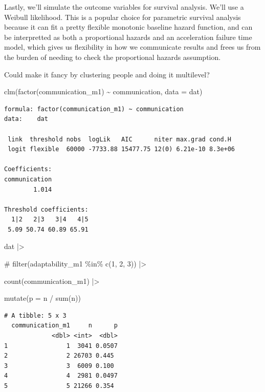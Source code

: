 \documentclass[
  letterpaper,
  DIV=11,
  numbers=noendperiod]{scrreprt}
\newenvironment{Shaded}{\begin{snugshade}}{\end{snugshade}}
\newcommand{\AttributeTok}[1]{\textcolor[rgb]{0.40,0.45,0.13}{#1}}
\newcommand{\CommentTok}[1]{\textcolor[rgb]{0.37,0.37,0.37}{#1}}
\newcommand{\FunctionTok}[1]{\textcolor[rgb]{0.28,0.35,0.67}{#1}}
\newcommand{\NormalTok}[1]{\textcolor[rgb]{0.00,0.23,0.31}{#1}}
\newcommand{\SpecialCharTok}[1]{\textcolor[rgb]{0.37,0.37,0.37}{#1}}
\begin{document}
Lastly, we'll simulate the outcome variables for survival analysis.
We'll use a Weibull likelihood. This is a popular choice for parametric
survival analysis because it can fit a pretty flexible monotonic
baseline hazard function, and can be interpretted as both a proportional
hazards and an acceleration failure time model, which gives us
flexibility in how we communicate results and frees us from the burden
of needing to check the proportional hazards assumption.

Could make it fancy by clustering people and doing it multilevel?

\begin{Shaded}
\begin{Highlighting}[]
\FunctionTok{clm}\NormalTok{(}\FunctionTok{factor}\NormalTok{(communication\_m1) }\SpecialCharTok{\textasciitilde{}}\NormalTok{ communication, }\AttributeTok{data =}\NormalTok{ dat)}
\end{Highlighting}
\end{Shaded}

\begin{verbatim}
formula: factor(communication_m1) ~ communication
data:    dat

 link  threshold nobs  logLik   AIC      niter max.grad cond.H 
 logit flexible  60000 -7733.88 15477.75 12(0) 6.21e-10 8.3e+06

Coefficients:
communication 
        1.014 

Threshold coefficients:
  1|2   2|3   3|4   4|5 
 5.09 50.74 60.89 65.91 
\end{verbatim}

\begin{Shaded}
\begin{Highlighting}[]
\NormalTok{dat }\SpecialCharTok{|\textgreater{}} 

 \CommentTok{\#   filter(adaptability\_m1 \%in\% c(1, 2, 3)) |\textgreater{}}

    \FunctionTok{count}\NormalTok{(communication\_m1) }\SpecialCharTok{|\textgreater{}}

    \FunctionTok{mutate}\NormalTok{(}\AttributeTok{p =}\NormalTok{ n }\SpecialCharTok{/} \FunctionTok{sum}\NormalTok{(n))}
\end{Highlighting}
\end{Shaded}

\begin{verbatim}
# A tibble: 5 x 3
  communication_m1     n      p
             <dbl> <int>  <dbl>
1                1  3041 0.0507
2                2 26703 0.445 
3                3  6009 0.100 
4                4  2981 0.0497
5                5 21266 0.354 
\end{verbatim}
\end{document}
